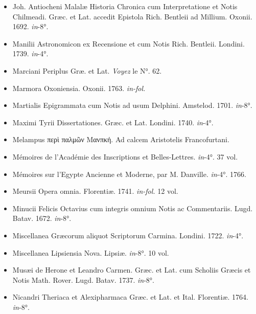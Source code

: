 \documentclass[a4paper, 11pt, oneside, polutonikogreek, french]{article}
\begin{document}
\begin{itemize}
    \item Joh. Antiocheni Malalæ Historia Chronica cum Interpretatione et Notis Chilmeadi. Græc. et Lat. accedit Epistola Rich. Bentleii ad Millium. Oxonii. 1692. \emph{in}-8°.

    \item Manilii Astronomicon ex Recensione et cum Notis Rich. Bentleii. Londini. 1739. \emph{in}-4°.

    \item Marciani Periplus Græ. et Lat. \emph{Voyez} le N°. 62.

    \item Marmora Oxoniensia. Oxonii. 1763. \emph{in-fol.}

    \item Martialis Epigrammata cum Notis ad usum Delphini. Amstelod. 1701. \emph{in}-8°.

    \item Maximi Tyrii Dissertationes. Græc. et Lat. Londini. 1740. \emph{in}-4°.

    \item Melampus περὶ παλμῶν Μανπκή. Ad calcem Aristotelis Francofurtani.

    \item Mémoires de l'Académie des Inscriptions et Belles-Lettres. \emph{in}-4°. 37 vol.

    \item Mémoires sur l'Egypte Ancienne et Moderne, par M. Danville. \emph{in}-4°. 1766.

    \item Meursii Opera omnia. Florentiæ. 1741. \emph{in-fol.} 12 vol.

    \item Minucii Felicis Octavius cum integris omnium Notis ac Commentariis. Lugd. Batav. 1672. \emph{in}-8°.

    \item Miscellanea Græcorum aliquot Scriptorum Carmina. Londini. 1722. \emph{in}-4°.

    \item Miscellanea Lipsiensia Nova. Lipsiæ. \emph{in}-8°. 10 vol.

    \item Musæi de Herone et Leandro Carmen. Græc. et Lat. cum Scholiis Græcis et Notis Math. Rover. Lugd. Batav. 1737. \emph{in}-8°.

    \item Nicandri Theriaca et Alexipharmaca Græc. et Lat. et Ital. Florentiæ. 1764. \emph{in}-8°.


\end{itemize}
\end{document}
